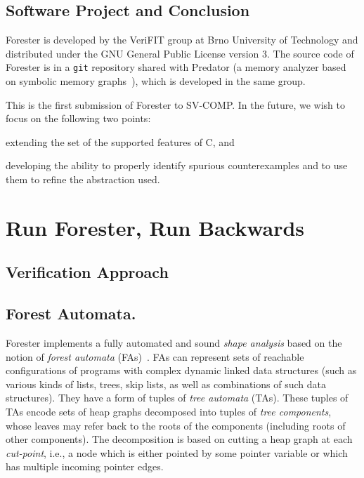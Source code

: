 \subsection{Software Project and Conclusion}\label{sec:project_contributors}

Forester is developed by the VeriFIT group at Brno University of Technology and distributed under the
GNU General Public License version 3.
The source code of Forester is in a \texttt{git} repository shared with Predator
(a memory analyzer based on symbolic memory graphs~\cite{predator}), which is
developed in the same group.

This is the first submission of Forester to SV-COMP.
In the future, we wish to focus on the following two points:
\begin{inparaenum}[(a)]
\item  extending the set of the supported features of C, and
\item  developing the ability to properly identify spurious counterexamples and
  to use them to refine the abstraction used.
\end{inparaenum}

\newpage
\section{Run Forester, Run Backwards}
\subsection{Verification Approach}\label{sec:verif_approach}
\subsection{Forest Automata.}

Forester implements a fully automated and sound \emph{shape analysis} based on
the notion of \emph{forest automata} (FAs)~\cite{fmsd12}. FAs can represent sets
of reachable configurations of programs with complex dynamic linked data
structures (such as various kinds of lists, trees, skip lists, as well as
combinations of such data structures). They have a form of tuples of \emph{tree
automata} (TAs). These tuples of TAs encode sets of heap graphs decomposed into
tuples of \emph{tree components}, whose leaves may refer back to the roots of the
components (including roots of other components). The decomposition is based on cutting a heap graph at each
\emph{cut-point}, i.e., a node which is either pointed by some pointer variable
or which has multiple incoming pointer edges. 


